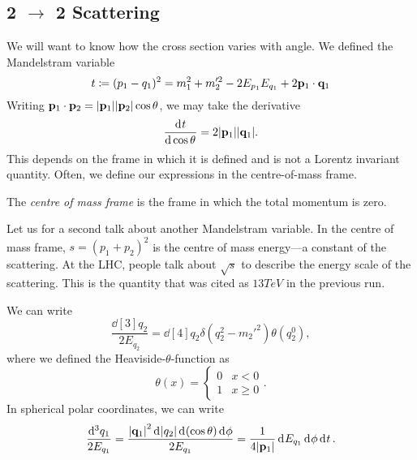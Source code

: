 
\subsection{2 \texorpdfstring{$\to$}{to} 2 Scattering}%
\label{sub:2_$to$_to_2_scattering}

We will want to know how the cross section varies with angle. We defined the Mandelstram variable 
\begin{equation}
  t \coloneqq (p_1 - q_1)^2 = m_1^2 + m_2'^2 - 2 E_{p_1} E_{q_1} + 2 \vb{p}_1 \cdot \vb{q}_1
\end{equation}
Writing $\vb{p}_1 \cdot \vb{p}_2 = \abs{\vb{p}_1} \abs{\vb{p}_2} \cos\theta$, we may take the derivative
\begin{equation}
  \dv[]{t}{\cos\theta}= 2 \abs{\vb{p}_1} \abs{\vb{q}_1}.
\end{equation}
This depends on the frame in which it is defined and is not a Lorentz invariant quantity.
Often, we define our expressions in the centre-of-mass frame.
\begin{definition}[]
  The \emph{centre of mass frame} is the frame in which the total momentum is zero.
\end{definition}

Let us for a second talk about another Mandelstram variable. In the centre of mass frame, $s = (p_1 + p_2)^2$ is the centre of mass energy---a constant of the scattering.
At the LHC, people talk about $\sqrt{s}$ to describe the energy scale of the scattering. This is the quantity that was cited as $13 TeV$ in the previous run.

We can write
\begin{equation}
  \frac{\dd[3]{q_2}}{2 E_{q_2}} = \dd[4]{q_2} \delta(q_2^2 -  m_2'^2) \theta(q_2^0),
\end{equation}
where we defined the Heaviside-$\theta$-function as
\begin{equation}
  \theta(x) = 
  \begin{cases}
    0 & x < 0 \\
    1 & x \geq 0
  \end{cases}.
\end{equation}
In spherical polar coordinates, we can write
\begin{equation}
  \frac{\dd[3]{q_1}}{2 E_{q_1}} = \frac{\abs{\vb{q}_1}^2 \dd[]{\abs{ q_2}} \dd[]{(\cos \theta)} \dd[]{\phi}}{2 E_{q_1}} = \frac{1}{4 \abs{\vb{p}_1}} \dd[]{E_{q_1}} \dd[]{\phi} \dd[]{t}.
\end{equation}

